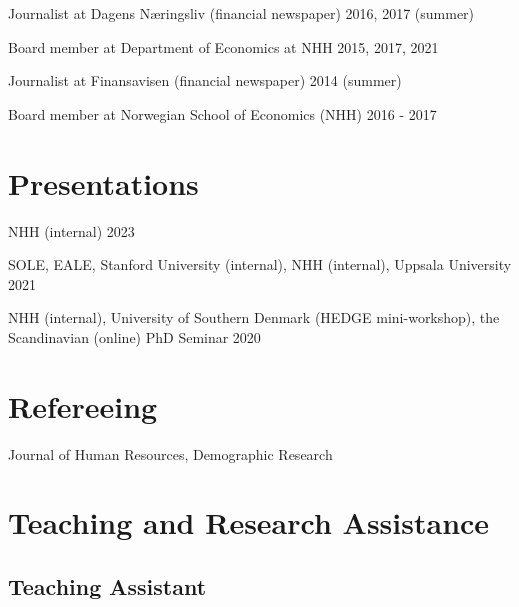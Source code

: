 \documentclass[11pt,]{article}
\begin{document}
Journalist at Dagens Næringsliv (financial newspaper) \hfill 2016, 2017
(summer)\vspace{-0.2cm}

Board member at Department of Economics at NHH \hfill 2015, 2017,
2021\vspace{-0.2cm}

Journalist at Finansavisen (financial newspaper) \hfill 2014
(summer)\vspace{-0.2cm}

Board member at Norwegian School of Economics (NHH) \hfill 2016 -
2017\vspace{-0.2cm}

\vspace{0.5cm}

\hypertarget{presentations}{%
\section{Presentations}\label{presentations}}

NHH (internal) \hfill 2023\vspace{-0.2cm}

SOLE, EALE, Stanford University (internal), NHH (internal), Uppsala
University \hfill 2021\vspace{-0.2cm}

NHH (internal), University of Southern Denmark (HEDGE mini-workshop),
the Scandinavian (online) PhD Seminar \hfill 2020\vspace{-0.2cm}

\vspace{0.5cm}

\hypertarget{refereeing}{%
\section{Refereeing}\label{refereeing}}

Journal of Human Resources, Demographic Research\vspace{-0.2cm}

\vspace{0.5cm}

\hypertarget{teaching-and-research-assistance}{%
\section{Teaching and Research
Assistance}\label{teaching-and-research-assistance}}

\hypertarget{teaching-assistant}{%
\subsection{Teaching Assistant}\label{teaching-assistant}}
\end{document}
